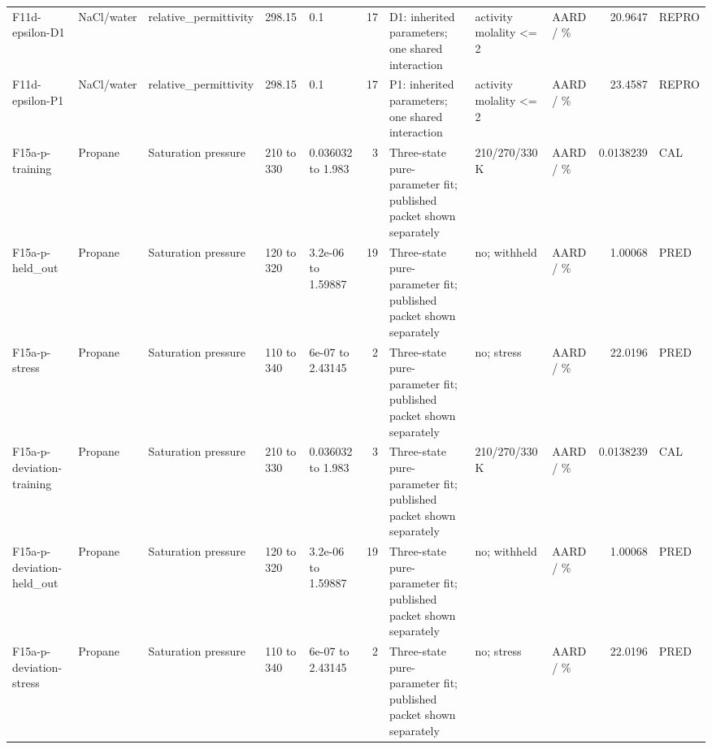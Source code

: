 \begin{landscape}
\begin{longtable}{L{1.9cm}L{2.5cm}L{2.1cm}L{1.6cm}L{1.6cm}rL{2.4cm}L{1.9cm}L{2.2cm}rL{1cm}}
F11d-\allowbreak{}epsilon-\allowbreak{}D1 & NaCl/\allowbreak{}water & relative\_\allowbreak{}permittivity & 298.15 & 0.1 & 17 & D1: inherited parameters; one shared interaction & activity molality <= 2 & AARD /\allowbreak{} \% & 20.9647 & REPRO \\
F11d-\allowbreak{}epsilon-\allowbreak{}P1 & NaCl/\allowbreak{}water & relative\_\allowbreak{}permittivity & 298.15 & 0.1 & 17 & P1: inherited parameters; one shared interaction & activity molality <= 2 & AARD /\allowbreak{} \% & 23.4587 & REPRO \\
F15a-\allowbreak{}p-\allowbreak{}training & Propane & Saturation pressure & 210 to 330 & 0.036032 to 1.983 & 3 & Three-\allowbreak{}state pure-\allowbreak{}parameter fit; published packet shown separately & 210/\allowbreak{}270/\allowbreak{}330 K & AARD /\allowbreak{} \% & 0.0138239 & CAL \\
F15a-\allowbreak{}p-\allowbreak{}held\_\allowbreak{}out & Propane & Saturation pressure & 120 to 320 & 3.2e-\allowbreak{}06 to 1.59887 & 19 & Three-\allowbreak{}state pure-\allowbreak{}parameter fit; published packet shown separately & no; withheld & AARD /\allowbreak{} \% & 1.00068 & PRED \\
F15a-\allowbreak{}p-\allowbreak{}stress & Propane & Saturation pressure & 110 to 340 & 6e-\allowbreak{}07 to 2.43145 & 2 & Three-\allowbreak{}state pure-\allowbreak{}parameter fit; published packet shown separately & no; stress & AARD /\allowbreak{} \% & 22.0196 & PRED \\
F15a-\allowbreak{}p-\allowbreak{}deviation-\allowbreak{}training & Propane & Saturation pressure & 210 to 330 & 0.036032 to 1.983 & 3 & Three-\allowbreak{}state pure-\allowbreak{}parameter fit; published packet shown separately & 210/\allowbreak{}270/\allowbreak{}330 K & AARD /\allowbreak{} \% & 0.0138239 & CAL \\
F15a-\allowbreak{}p-\allowbreak{}deviation-\allowbreak{}held\_\allowbreak{}out & Propane & Saturation pressure & 120 to 320 & 3.2e-\allowbreak{}06 to 1.59887 & 19 & Three-\allowbreak{}state pure-\allowbreak{}parameter fit; published packet shown separately & no; withheld & AARD /\allowbreak{} \% & 1.00068 & PRED \\
F15a-\allowbreak{}p-\allowbreak{}deviation-\allowbreak{}stress & Propane & Saturation pressure & 110 to 340 & 6e-\allowbreak{}07 to 2.43145 & 2 & Three-\allowbreak{}state pure-\allowbreak{}parameter fit; published packet shown separately & no; stress & AARD /\allowbreak{} \% & 22.0196 & PRED \\

\end{longtable}
\end{landscape}
